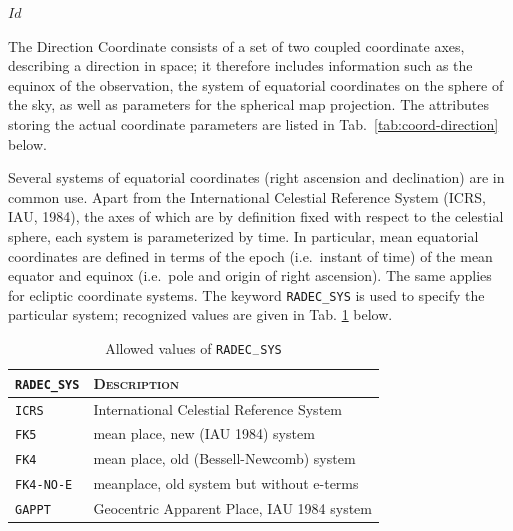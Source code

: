 \svnInfo $Id$


The Direction Coordinate consists of a set of two coupled coordinate
axes, describing a direction in space; it therefore includes
information such as the equinox of the observation, the system of
equatorial coordinates on the sphere of the sky, as well as parameters
for the spherical map projection. The attributes storing the actual
coordinate parameters are listed in Tab.~\ref{tab:coord-direction} below.



Several systems of equatorial coordinates (right ascension and
declination) are in common use. Apart from the International Celestial
Reference System (ICRS, IAU, 1984), the axes of which are by
definition fixed with respect to the celestial sphere, each system is
parameterized by time. In particular, mean equatorial coordinates are
defined in terms of the epoch (i.e.\ instant of time) of the mean
equator and equinox (i.e.\ pole and origin of right ascension). The
same applies for ecliptic coordinate systems. The keyword
\verb|RADEC_SYS| is used to specify the particular system; recognized
values are given in Tab. \ref{tab:radec-sys} below.

\begin{table}[ht]
  \centering
  \begin{tabular}{ll}
    \hline
    \verb|RADEC_SYS| & \textsc{Description} \\
    \hline \hline
    \verb|ICRS|     & International Celestial Reference System \\
    \verb|FK5|      & mean place, new (IAU 1984) system \\
    \verb|FK4|      & mean place, old (Bessell-Newcomb) system \\
    \verb|FK4-NO-E| & meanplace, old system but without e-terms \\
    \verb|GAPPT|    & Geocentric Apparent Place, IAU 1984 system \\
    \hline
  \end{tabular}
  \caption{Allowed values of \texttt{RADEC$_-$SYS}}
  \label{tab:radec-sys}
\end{table}
